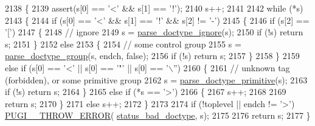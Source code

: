 \begin{DoxyCode}
2138         \{
2139             assert(s[0] == \textcolor{charliteral}{'<'} && s[1] == \textcolor{charliteral}{'!'});
2140             s++;
2141 
2142             \textcolor{keywordflow}{while} (*s)
2143             \{
2144                 \textcolor{keywordflow}{if} (s[0] == \textcolor{charliteral}{'<'} && s[1] == \textcolor{charliteral}{'!'} && s[2] != \textcolor{charliteral}{'-'})
2145                 \{
2146                     \textcolor{keywordflow}{if} (s[2] == \textcolor{charliteral}{'['})
2147                     \{
2148                         \textcolor{comment}{// ignore}
2149                         s = \hyperlink{structxml__parser_a1e996ac9c9993f1939128859596376a1}{parse\_doctype\_ignore}(s);
2150                         \textcolor{keywordflow}{if} (!s) \textcolor{keywordflow}{return} s;
2151                     \}
2152                     \textcolor{keywordflow}{else}
2153                     \{
2154                         \textcolor{comment}{// some control group}
2155                         s = \hyperlink{structxml__parser_a9bc0e5f3d75cd7edb267a85430e1cdfc}{parse\_doctype\_group}(s, endch, \textcolor{keyword}{false});
2156                         \textcolor{keywordflow}{if} (!s) \textcolor{keywordflow}{return} s;
2157                     \}
2158                 \}
2159                 \textcolor{keywordflow}{else} \textcolor{keywordflow}{if} (s[0] == \textcolor{charliteral}{'<'} || s[0] == \textcolor{charliteral}{'"'} || s[0] == \textcolor{charliteral}{'\(\backslash\)''})
2160                 \{
2161                     \textcolor{comment}{// unknown tag (forbidden), or some primitive group}
2162                     s = \hyperlink{structxml__parser_a722853b603ad9a1d1f61bb8115bea5b4}{parse\_doctype\_primitive}(s);
2163                     \textcolor{keywordflow}{if} (!s) \textcolor{keywordflow}{return} s;
2164                 \}
2165                 \textcolor{keywordflow}{else} \textcolor{keywordflow}{if} (*s == \textcolor{charliteral}{'>'})
2166                 \{
2167                     s++;
2168 
2169                     \textcolor{keywordflow}{return} s;
2170                 \}
2171                 \textcolor{keywordflow}{else} s++;
2172             \}
2173 
2174             \textcolor{keywordflow}{if} (!toplevel || endch != \textcolor{charliteral}{'>'}) \hyperlink{pugixml_8cpp_a8af02d87a10272f03f96ab93a96d7202}{PUGI\_\_THROW\_ERROR}(
      \hyperlink{namespacepugi_a9054ca609e12afb8f3e5892fc6c0b555a58d1b0d8787e97fc1b5b31ec5e4fabcf}{status\_bad\_doctype}, s);
2175 
2176             \textcolor{keywordflow}{return} s;
2177         \}
\end{DoxyCode}
